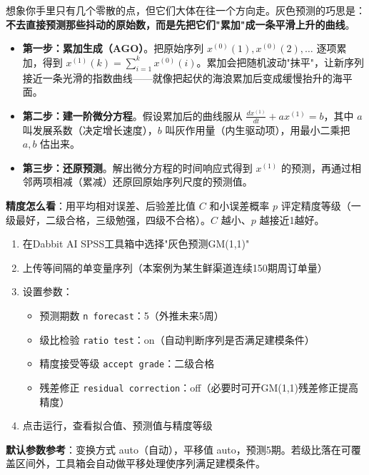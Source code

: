 \begin{algoprinciple}
想象你手里只有几个零散的点，但它们大体在往一个方向走。灰色预测的巧思是：\textbf{不去直接预测那些抖动的原始数，而是先把它们"累加"成一条平滑上升的曲线}。

\begin{itemize}
    \item \textbf{第一步：累加生成（AGO）}。把原始序列 $x^{(0)}(1),x^{(0)}(2),\ldots$ 逐项累加，得到 $x^{(1)}(k)=\sum_{i=1}^{k}x^{(0)}(i)$。累加会把随机波动"抹平"，让新序列接近一条光滑的指数曲线——就像把起伏的海浪累加后变成缓慢抬升的海平面。
    \item \textbf{第二步：建一阶微分方程}。假设累加后的曲线服从 $\frac{dx^{(1)}}{dt}+a x^{(1)}=b$，其中 $a$ 叫发展系数（决定增长速度），$b$ 叫灰作用量（内生驱动项），用最小二乘把 $a,b$ 估出来。
    \item \textbf{第三步：还原预测}。解出微分方程的时间响应式得到 $x^{(1)}$ 的预测，再通过相邻两项相减（累减）还原回原始序列尺度的预测值。
\end{itemize}

\textbf{精度怎么看}：用平均相对误差、后验差比值 $C$ 和小误差概率 $p$ 评定精度等级（一级最好，二级合格，三级勉强，四级不合格）。$C$ 越小、$p$ 越接近1越好。
\end{algoprinciple}

\begin{algosposs}
\begin{enumerate}
    \item 在Dabbit AI SPSS工具箱中选择"灰色预测GM(1,1)"
    \item 上传等间隔的单变量序列（本案例为某生鲜渠道连续150期周订单量）
    \item 设置参数：
    \begin{itemize}
        \item 预测期数 \texttt{n forecast}：5（外推未来5周）
        \item 级比检验 \texttt{ratio test}：on（自动判断序列是否满足建模条件）
        \item 精度接受等级 \texttt{accept grade}：二级合格
        \item 残差修正 \texttt{residual correction}：off（必要时可开GM(1,1)残差修正提高精度）
    \end{itemize}
    \item 点击运行，查看拟合值、预测值与精度等级
\end{enumerate}

\textbf{默认参数参考}：变换方式 auto（自动），平移值 auto，预测5期。若级比落在可覆盖区间外，工具箱会自动做平移处理使序列满足建模条件。
\end{algosposs}

